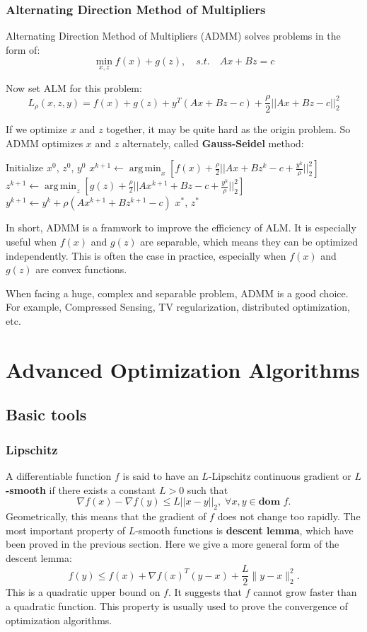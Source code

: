 \documentclass[lang=en,color=blue,mode=fancy,titlestyle=hang]{elegantbook}
\DeclareMathOperator*{\argmin}{arg\,min}
\begin{document}
\subsection{Alternating Direction Method of Multipliers}

Alternating Direction Method of Multipliers (ADMM) solves problems in the form of:
\[
  \min_{x,z} f(x) + g(z), \quad s.t. \quad Ax + Bz = c
\]

Now set ALM for this problem:
\[
  L_\rho(x, z, y) = f(x) + g(z) + y^T (Ax + Bz - c) + \frac{\rho}{2}
  ||Ax + Bz - c||_2^2
\]

If we optimize $x$ and $z$ together, it may be quite hard as the origin problem.
So ADMM optimizes $x$ and $z$ alternately, called \textbf{Gauss-Seidel} method:
\begin{algorithm}[H]
\caption{Alternating Direction Method of Multipliers}
\begin{algorithmic}
\State Initialize $x^0$, $z^0$, $y^0$
  \State $x^{k+1} \gets \argmin_x \left[ f(x) + \frac{\rho}{2} ||Ax + Bz^k - c + \frac{y^k}{\rho}||_2^2 \right]$
  \State $z^{k+1} \gets \argmin_z \left[ g(z) + \frac{\rho}{2} ||Ax^{k+1} + Bz - c + \frac{y^k}{\rho}||_2^2 \right]$
  \State $y^{k+1} \gets y^k + \rho (Ax^{k+1} + Bz^{k+1} - c)$
\EndWhile
\State \Return $x^*$, $z^*$
\end{algorithmic}
\end{algorithm}

In short, ADMM is a framwork to improve the efficiency of ALM. It is especially
useful when $f(x)$ and $g(z)$ are separable, which means they can be optimized
independently. This is often the case in practice, especially when $f(x)$ and
$g(z)$ are convex functions.

When facing a huge, complex and separable problem, ADMM is a good choice.
For example, Compressed Sensing, TV regularization, distributed optimization, etc.

\newpage
\chapter{Advanced Optimization Algorithms}
\section{Basic tools}
\subsection{Lipschitz}
A differentiable function $f$ is said to have an $L$-Lipschitz continuous gradient or
\textbf{$L$-smooth} if there exists a constant $L > 0$ such that
\[
\nabla f(x) - \nabla f(y) \leq L ||x - y||_2, \; \forall x, y \in \textbf{dom } f.
\]
Geometrically, this means that the gradient of $f$ does not change too rapidly.
The most important property of $L$-smooth functions is \textbf{descent lemma}, which have been
proved in the previous section. Here we give a more general form of the descent lemma:
\[
f(y) \le f(x) + \nabla f(x)^T (y-x) + \frac{L}{2} \|y-x\|_2^2.
\]
This is a quadratic upper bound on $f$. It suggests that $f$ cannot grow faster than a
quadratic function. This property is usually used to prove the convergence of optimization algorithms.
\end{document}
